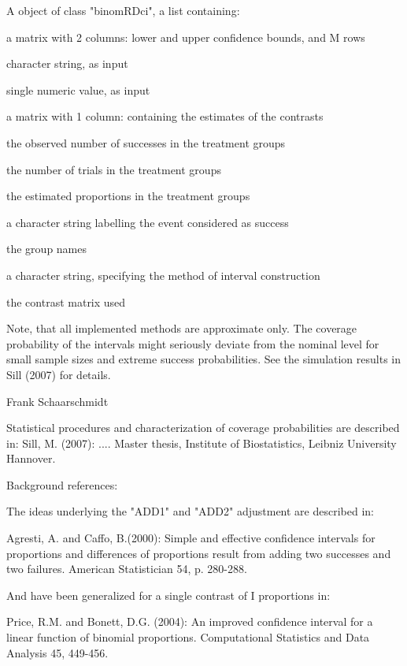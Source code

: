 \begin{Value}
A object of class "binomRDci", a list containing:
\begin{ldescription}
\item[\code{conf.int}] a matrix with 2 columns: lower and upper confidence bounds, and M rows
\item[\code{alternative }] character string, as input
\item[\code{conf.level}] single numeric value, as input
\item[\code{estimate}] a matrix with 1 column: containing the estimates of the contrasts
\item[\code{x}] the observed number of successes in the treatment groups
\item[\code{n}] the number of trials in the treatment groups
\item[\code{p}] the estimated proportions in the treatment groups
\item[\code{success}] a character string labelling the event considered as success
\item[\code{names}] the group names
\item[\code{method}] a character string, specifying the method of interval construction
\item[\code{cmat}] the contrast matrix used
\end{ldescription}
\end{Value}
\begin{Note}\relax
Note, that all implemented methods are approximate only. The coverage probability of the 
intervals might seriously deviate from the nominal level for small sample sizes and extreme success probabilities.
See the simulation results in Sill (2007) for details.
\end{Note}
\begin{Author}\relax
Frank Schaarschmidt
\end{Author}
\begin{References}\relax
Statistical procedures and characterization of coverage probabilities are described in:
Sill, M. (2007):
....
Master thesis, Institute of Biostatistics, Leibniz University Hannover.

Background references:

The ideas underlying the "ADD1" and "ADD2" adjustment are described in:

Agresti, A. and Caffo, B.(2000):
Simple and effective confidence intervals for proportions and differences of proportions result from adding two successes and two failures.
American Statistician 54, p. 280-288.

And have been generalized for a single contrast of I proportions in:

Price, R.M. and Bonett, D.G. (2004):
An improved confidence interval for a linear function of binomial proportions.
Computational Statistics and Data Analysis 45, 449-456.
\end{References}
